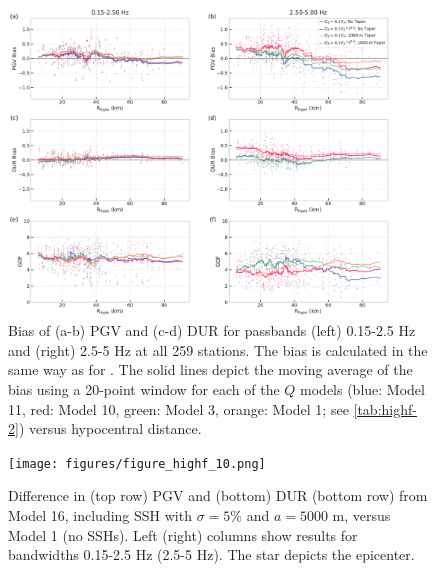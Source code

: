 \begin{figure}[!ht]
  \centering
  \includegraphics[width=0.9\textwidth,height=0.9\textheight,keepaspectratio]{figures/figure_highf_9.pdf}
  \caption{Bias of (a-b) PGV and (c-d) DUR for passbands (left) 0.15-2.5 Hz and (right) 2.5-5 Hz at all 259 stations. The bias is calculated in the same way as for . The solid lines depict the moving average of the bias using a 20-point window for each of the $Q$ models (blue: Model 11, red: Model 10, green: Model 3, orange: Model 1; see \cref{tab:highf-2}) versus hypocentral distance.
  }
  \label{fig:highf-9}
\end{figure}
\clearpage

\begin{figure}[!ht]
  \centering
  \texttt{[image: figures/figure\_highf\_10.png]}
  \caption{Difference in (top row) PGV and (bottom) DUR (bottom row) from Model 16, including SSH with $\sigma = 5\%$ and $a = 5000$ m, versus Model 1 (no SSHs). Left (right) columns show results for bandwidths 0.15-2.5 Hz (2.5-5 Hz). The star depicts the epicenter.
  }
  \label{fig:highf-10}
\end{figure}
\clearpage

